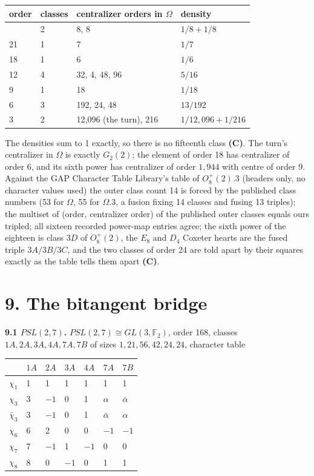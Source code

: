 \documentclass[
]{article}
\newcounter{none} %
\begin{document}
{\def\LTcaptype{none} %
\begin{longtable}[]{@{}llll@{}}
\toprule\noalign{}
order & classes & centralizer orders in \(\Omega\) & density \\
\midrule\noalign{}
\endhead
\bottomrule\noalign{}
\endlastfoot
24 & 2 & 8, 8 & \(1/8 + 1/8\) \\
21 & 1 & 7 & \(1/7\) \\
18 & 1 & 6 & \(1/6\) \\
12 & 4 & 32, 4, 48, 96 & \(5/16\) \\
9 & 1 & 18 & \(1/18\) \\
6 & 3 & 192, 24, 48 & \(13/192\) \\
3 & 2 & 12,096 (the turn), 216 & \(1/12{,}096 + 1/216\) \\
\end{longtable}
}

The densities sum to 1 exactly, so there is no fifteenth class
\textbf{(C)}. The turn's centralizer in \(\Omega\) is exactly
\(G_2(2)\); the element of order 18 has centralizer of order 6, and its
sixth power has centralizer of order \(1{,}944\) with centre of order 9.
Against the GAP Character Table Library's table of \(O_8^+(2).3\)
(headers only, no character values used) the outer class count 14 is
forced by the published class numbers (53 for \(\Omega\), 55 for
\(\Omega.3\), a fusion fixing 14 classes and fusing 13 triples); the
multiset of (order, centralizer order) of the published outer classes
equals ours tripled; all sixteen recorded power-map entries agree; the
sixth power of the eighteen is class \(3D\) of \(O_8^+(2)\), the \(E_8\)
and \(D_4\) Coxeter hearts are the fused triple \(3A/3B/3C\), and the
two classes of order 24 are told apart by their squares exactly as the
table tells them apart \textbf{(C)}.

\section{9. The bitangent bridge}\label{the-bitangent-bridge}

\textbf{9.1 \(PSL(2,7)\).} \(PSL(2,7) \cong GL(3,\mathbb{F}_2)\), order
168, classes \(1A, 2A, 3A, 4A, 7A, 7B\) of sizes
\(1, 21, 56, 42, 24, 24\), character table

{\def\LTcaptype{none} %
\begin{longtable}[]{@{}lllllll@{}}
\toprule\noalign{}
& \(1A\) & \(2A\) & \(3A\) & \(4A\) & \(7A\) & \(7B\) \\
\midrule\noalign{}
\endhead
\bottomrule\noalign{}
\endlastfoot
\(\chi_1\) & 1 & 1 & 1 & 1 & 1 & 1 \\
\(\chi_3\) & 3 & \(-1\) & 0 & 1 & \(\alpha\) & \(\bar\alpha\) \\
\(\bar\chi_3\) & 3 & \(-1\) & 0 & 1 & \(\bar\alpha\) & \(\alpha\) \\
\(\chi_6\) & 6 & 2 & 0 & 0 & \(-1\) & \(-1\) \\
\(\chi_7\) & 7 & \(-1\) & 1 & \(-1\) & 0 & 0 \\
\(\chi_8\) & 8 & 0 & \(-1\) & 0 & 1 & 1 \\
\end{longtable}
}
\end{document}
